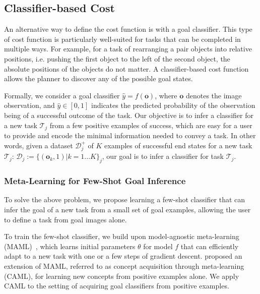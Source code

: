 \subsection{Classifier-based Cost}
\label{subsec:class_cost}
An alternative way to define the cost function is with a goal classifier. This type of cost function is particularly well-suited for tasks that can be completed in multiple ways. For example, for a task of rearranging a pair objects into relative positions, i.e. pushing the first object to the left of the second object, the absolute positions of the objects do not matter. A classifier-based cost function allows the planner to discover any of the possible goal states.

\newcommand{\task}{\mathcal{T}}
\newcommand{\data}{\mathcal{D}}
\newcommand{\obs}{\mathbf{o}}
\newcommand{\out}{y}
\newcommand{\posdata}{\data^+}
\newcommand{\testdata}{\data^\text{test}}
\newcommand{\loss}{\mathcal{L}}

Formally, we consider a goal classifier $\hat{\out} = f(\obs)$, where $\obs$ denotes the image observation, and $\hat{\out} \in [0,1]$ indicates the predicted probability of the observation being of a successful outcome of the task. Our objective is to infer a classifier for a new task $\task_j$ from a few positive examples of success, which are easy for a user to provide and encode the minimal information needed to convey a task. In other words, given a dataset $\posdata_j$ of $K$ examples of successful end states for a new task $\task_j$: $\data_j:=\{(\obs_k, 1) | k = 1...K\}_j$, our goal is to infer a classifier for task $\task_j$.

\subsubsection{Meta-Learning for Few-Shot Goal Inference}

To solve the above problem, we propose learning a few-shot classifier that can infer the goal of a new task from a small set of goal examples, allowing the user to define a task from goal images alone.

To train the few-shot classifier, we build upon model-agnostic meta-learning (MAML)~\cite{maml}, which learns initial parameters $\theta$ for model $f$ that can efficiently adapt to a new task with one or a few steps of gradient descent. \cite{caml} proposed an extension of MAML, referred to as concept acquisition through meta-learning (CAML), for learning new concepts from positive examples alone. We apply CAML to the setting of acquiring goal classifiers from positive examples.

